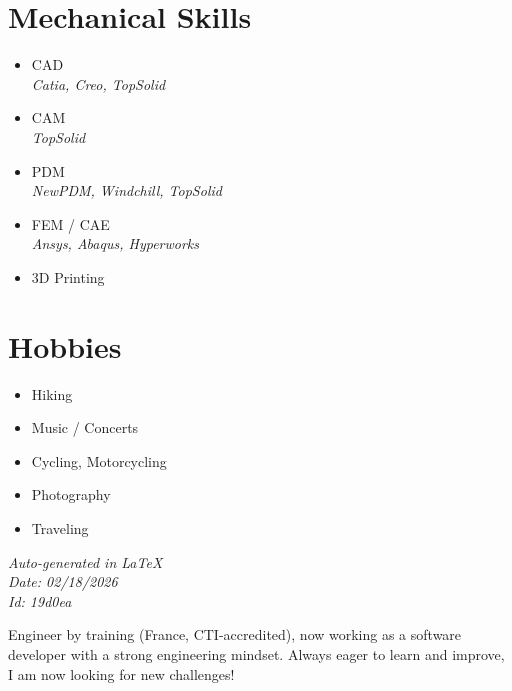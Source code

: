 \documentclass[]{friggeri-cv}
\begin{document}
\begin{aside}
\section{Mechanical Skills}
\begin{itemize}
\item CAD
 \\ \hspace*{0.2em}\small\textit{Catia, Creo, TopSolid}
\item CAM
 \\ \hspace*{0.2em}\small\textit{TopSolid}
\item PDM
 \\ \hspace*{0.2em}\small\textit{NewPDM, Windchill, TopSolid}
\item FEM / CAE
 \\ \hspace*{0.2em}\small\textit{Ansys, Abaqus, Hyperworks}
\item 3D Printing
\end{itemize}
\section{Hobbies}
\begin{itemize}
\item Hiking
\item Music / Concerts
\item Cycling, Motorcycling
\item Photography
\item Traveling
\end{itemize}
\vspace{2.5mm}%
\small \emph{Auto-generated in \LaTeX}\\
\small \emph{Date: 02/18/2026} \hspace*{8mm}\\
\small \emph{Id: 19d0ea} %

\end{aside}

\vspace*{-2.0mm}
\noindent\parbox{\linewidth}{
  \centering
  Engineer by training (France, CTI-accredited), now working as a software developer with a strong engineering mindset. Always eager to learn and improve, I am now looking for new challenges!
}
\vspace*{0.8mm}
\end{document}
